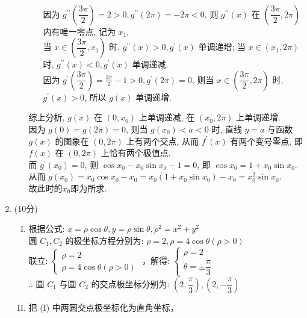 \documentclass[11pt]{article}
\begin{document}
\begin{enumerate}
\begin{enumerate}[(I)]
\begin{enumerate}
			\\因为 $g^{\prime \prime}\left(\dfrac{3 \pi}{2}\right)=2>0, g^{\prime \prime}(2 \pi)=-2 \pi<0$, 则 $g^{\prime \prime}(x)$ 在 $\left(\dfrac{3 \pi}{2}, 2 \pi\right)$ 内有唯一零点, 记为 $x_{1}$, 
			\\当 $x \in\left(\dfrac{3 \pi}{2}, x_{1}\right)$ 时, $g^{\prime \prime}(x)>0, g^{\prime}(x)$ 单调递增; 当 $x \in\left(x_{1}, 2 \pi\right)$ 时, $g^{\prime \prime}(x)<0, g^{\prime}(x)$ 单调递减.
			\\因为 $g^{\prime}\left(\dfrac{3 \pi}{2}\right)=\frac{3 \pi}{2}-1>0, g^{\prime}(2 \pi)=0$, 则当 $x \in\left(\dfrac{3 \pi}{2}, 2 \pi\right)$ 时, $g^{\prime}(x)>0$, 所以 $g(x)$ 单调递增. 
		\end{enumerate}
	综上分析, $g(x)$ 在 $\left(0, x_{0}\right)$ 上单调递减, 在 $\left(x_{0}, 2 \pi\right)$ 上单调递增.
	\\因为 $g(0)=g(2 \pi)=0$, 则当 $g\left(x_{0}\right)<a<0$ 时, 直线 $y=a$ 与函数 $g(x)$ 的图象在 $(0,2 \pi)$ 上有两个交点,
	从而 $f^{\prime}(x)$ 有两个变号零点, 即 $f(x)$ 在 $(0,2 \pi)$ 上恰有两个极值点.
	\\而 $g^{\prime}\left(x_{0}\right)=0$, 则 $\cos x_{0}-x_{0} \sin x_{0}-1=0$, 即 $\cos x_{0}=1+x_{0} \sin x_{0}$.
	从而 $g\left(x_{0}\right)=x_{0} \cos x_{0}-x_{0}=x_{0}\left(1+x_{0} \sin x_{0}\right)-x_{0}=x_{0}^{2} \sin x_{0}$. 
	\\故此时的$ x_0 $即为所求.
	\end{enumerate}
		\item (10分)
	\begin{enumerate}[(I)]
		\item 根据公式: $x=\rho \cos \theta, y=\rho \sin \theta, \rho^{2}=x^{2}+y^{2}$ 
		\\圆 $C_{1}, C_{2}$ 的极坐标方程分别为: $\rho=2, \rho=4 \cos \theta(\rho>0)$ 
		\\联立: $\left\{\begin{array}{l}\rho=2 \\ \rho=4 \cos \theta(\rho>0)\end{array}\right.$ ，解得: $\left\{\begin{array}{l}\rho=2 \\ \theta=\pm \dfrac{\pi}{3}\end{array}\right.$
		\\$\therefore$ 圆 $C_{1}$ 与圆 $C_{2}$ 的交点极坐标分别为: $\left(2, \dfrac{\pi}{3}\right),\left(2,-\dfrac{\pi}{3}\right)$ 
		\item 把 (I) 中两圆交点极坐标化为直角坐标，

\end{enumerate}
\end{enumerate}
\end{document}
